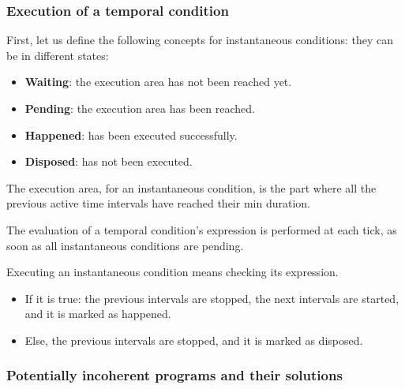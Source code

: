 \documentclass[applsci,article,submit,moreauthors,pdftex,10pt,a4paper]{mdpi}
\begin{document}
\subsubsection{Execution of a temporal condition}

First, let us define the following concepts for instantaneous conditions: they can be in different states:
\begin{itemize}
\item \textbf{Waiting}: the execution area has not been reached yet.
\item \textbf{Pending}: the execution area has been reached.
\item \textbf{Happened}: has been executed successfully.
\item \textbf{Disposed}: has not been executed.
\end{itemize}

The execution area, for an instantaneous condition, is the part where all the previous active time intervals have reached their min duration.

The evaluation of a temporal condition's expression is performed at each tick, as soon as all instantaneous conditions are pending. 

Executing an instantaneous condition means checking its expression.
\begin{itemize}
\item If it is true: the previous intervals are stopped, the next intervals are started, and it is marked as happened. 
\item Else, the previous intervals are stopped, and it is marked as disposed.
\end{itemize}

\subsubsection{Potentially incoherent programs and their solutions}
\end{document}
